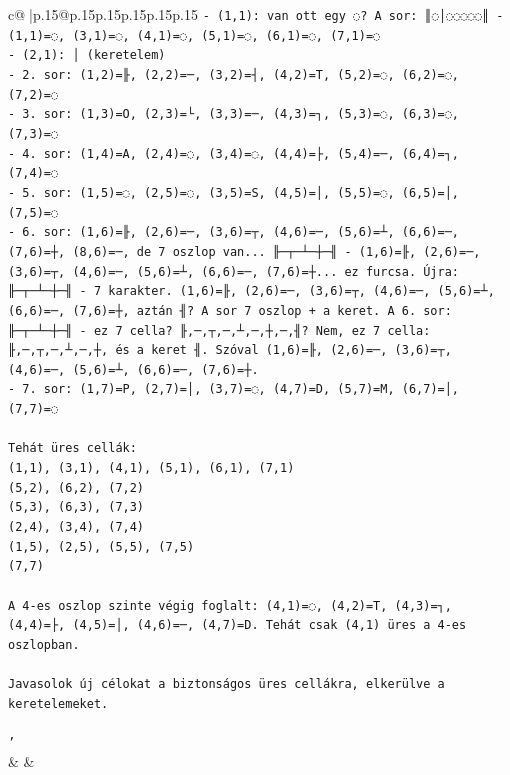 \documentclass{article}
\begin{document}
{\begin{supertabular}{c@{$\;$}|p{.15\linewidth}@{}p{.15\linewidth}p{.15\linewidth}p{.15\linewidth}p{.15\linewidth}p{.15\linewidth}}
{{{\texttt{{-} (1,1): van ott egy ◌? A sor: ║◌│◌◌◌◌◌║ {-} (1,1)=◌, (3,1)=◌, (4,1)=◌, (5,1)=◌, (6,1)=◌, (7,1)=◌} \\
\texttt{{-} (2,1): │ (keretelem)} \\
\texttt{{-} 2. sor: (1,2)=╟, (2,2)=─, (3,2)=┤, (4,2)=T, (5,2)=◌, (6,2)=◌, (7,2)=◌} \\
\texttt{{-} 3. sor: (1,3)=O, (2,3)=└, (3,3)=─, (4,3)=┐, (5,3)=◌, (6,3)=◌, (7,3)=◌} \\
\texttt{{-} 4. sor: (1,4)=A, (2,4)=◌, (3,4)=◌, (4,4)=├, (5,4)=─, (6,4)=┐, (7,4)=◌} \\
\texttt{{-} 5. sor: (1,5)=◌, (2,5)=◌, (3,5)=S, (4,5)=│, (5,5)=◌, (6,5)=│, (7,5)=◌} \\
\texttt{{-} 6. sor: (1,6)=╟, (2,6)=─, (3,6)=┬, (4,6)=─, (5,6)=┴, (6,6)=─, (7,6)=┼, (8,6)=─, de 7 oszlop van... ╟─┬─┴─┼─╢ {-} (1,6)=╟, (2,6)=─, (3,6)=┬, (4,6)=─, (5,6)=┴, (6,6)=─, (7,6)=┼... ez furcsa. Újra: ╟─┬─┴─┼─╢ {-} 7 karakter. (1,6)=╟, (2,6)=─, (3,6)=┬, (4,6)=─, (5,6)=┴, (6,6)=─, (7,6)=┼, aztán ╢? A sor 7 oszlop + a keret. A 6. sor: ╟─┬─┴─┼─╢ {-} ez 7 cella? ╟,─,┬,─,┴,─,┼,─,╢? Nem, ez 7 cella: ╟,─,┬,─,┴,─,┼, és a keret ╢. Szóval (1,6)=╟, (2,6)=─, (3,6)=┬, (4,6)=─, (5,6)=┴, (6,6)=─, (7,6)=┼.} \\
\texttt{{-} 7. sor: (1,7)=P, (2,7)=│, (3,7)=◌, (4,7)=D, (5,7)=M, (6,7)=│, (7,7)=◌} \\
\\ 
\texttt{Tehát üres cellák:} \\
\texttt{(1,1), (3,1), (4,1), (5,1), (6,1), (7,1)} \\
\texttt{(5,2), (6,2), (7,2)} \\
\texttt{(5,3), (6,3), (7,3)} \\
\texttt{(2,4), (3,4), (7,4)} \\
\texttt{(1,5), (2,5), (5,5), (7,5)} \\
\texttt{(7,7)} \\
\\ 
\texttt{A 4{-}es oszlop szinte végig foglalt: (4,1)=◌, (4,2)=T, (4,3)=┐, (4,4)=├, (4,5)=│, (4,6)=─, (4,7)=D. Tehát csak (4,1) üres a 4{-}es oszlopban.} \\
\\ 
\texttt{Javasolok új célokat a biztonságos üres cellákra, elkerülve a keretelemeket.} \\
\\ 
\texttt{'} \\
            }
        }
    }
    & & \\ \\


\end{supertabular}}
\end{document}
